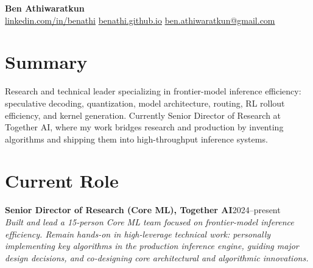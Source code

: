 \documentclass[11pt,letterpaper]{article}
\newcommand{\entrytitle}[2]{%
  \noindent\textbf{#1}\hfill #2\\
}
\newcommand{\entrysubtitle}[1]{%
  \noindent\textit{#1}\vspace{2pt}\\
}
\begin{document}
\begin{center}
{\LARGE \textbf{Ben Athiwaratkun}}\\[6pt]
\href{https://linkedin.com/in/benathi}{linkedin.com/in/benathi} \quad
\href{https://benathi.github.io}{benathi.github.io} \quad
\href{mailto:ben.athiwaratkun@gmail.com}{ben.athiwaratkun@gmail.com}
\end{center}

\section{Summary}
Research and technical leader specializing in frontier-model inference efficiency: speculative decoding, quantization, model architecture, routing, RL rollout efficiency, and kernel generation. Currently Senior Director of Research at Together AI, where my work bridges research and production by inventing algorithms and shipping them into high-throughput inference systems.


\section{Current Role}

\entrytitle{Senior Director of Research (Core ML), Together AI}{2024--present}
\entrysubtitle{Built and lead a 15-person Core ML team focused on frontier-model inference efficiency. Remain hands-on in high-leverage technical work: personally implementing key algorithms in the production inference engine, guiding major design decisions, and co-designing core architectural and algorithmic innovations.}
\end{document}
